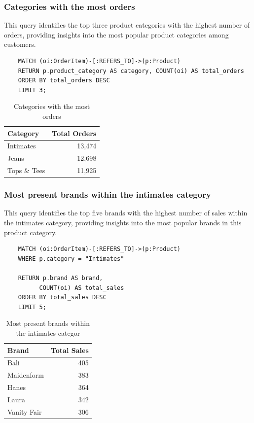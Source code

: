 \documentclass[a4paper,12pt]{article}
\begin{document}
  \subsubsection{Categories with the most orders}
  This query identifies the top three product categories with the highest number of orders, providing insights into the most popular product categories among customers.
  \begin{verbatim}  
    MATCH (oi:OrderItem)-[:REFERS_TO]->(p:Product)
    RETURN p.product_category AS category, COUNT(oi) AS total_orders
    ORDER BY total_orders DESC
    LIMIT 3;
  \end{verbatim}
  \begin{table}[h!]
    \centering
    \caption{Categories with the most orders}
    \label{tab:total_orders_category}
    \begin{tabular}{l r}
        \toprule
        \textbf{Category} & \textbf{Total Orders} \\
        \midrule
        Intimates     & 13,474 \\
        Jeans         & 12,698 \\
        Tops \& Tees  & 11,925 \\
        \bottomrule
    \end{tabular}
\end{table}

   \subsubsection{Most present brands within the intimates category}
    This query identifies the top five brands with the highest number of sales within the intimates category, providing insights into the most popular brands in this product category.
   \begin{verbatim}
    MATCH (oi:OrderItem)-[:REFERS_TO]->(p:Product)
    WHERE p.category = "Intimates"

    RETURN p.brand AS brand, 
          COUNT(oi) AS total_sales
    ORDER BY total_sales DESC
    LIMIT 5;
    \end{verbatim}

    \begin{table}[h!]
      \centering
      \caption{Most present brands within the intimates categor}
      \label{tab:total_sales}
      \begin{tabular}{l r}
          \toprule
          \textbf{Brand}     & \textbf{Total Sales} \\
          \midrule
          Bali           & 405 \\
          Maidenform    & 383 \\
          Hanes         & 364 \\
          Laura         & 342 \\
          Vanity Fair   & 306 \\
          \bottomrule
      \end{tabular}
  \end{table}
\end{document}
